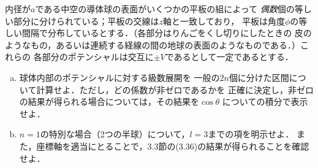 \begin{bx1}
    内径が$a$である中空の導体球の表面がいくつかの平板の組によって
    \emph{偶数}個の等しい部分に分けられている；平板の交線は$z$軸と一致しており，
    平板は角度$\phi$の等しい間隔で分布しているとする．（各部分はりんごをくし切りにしたときの
    皮のようなもの，あるいは連続する経線の間の地球の表面のようなものである．）これらの
    各部分のポテンシャルは交互に$\pm V$であるとして一定であるとする．
    \begin{enumerate}[(a)]%
      \item 球体内部のポテンシャルに対する級数展開を
        一般の$2n$個に分けた区間について計算せよ．ただし，どの係数が非ゼロであるかを
        正確に決定し，非ゼロの結果が得られる場合については，その結果を$\cos\theta$
        についての積分で表示せよ．
      \item $n = 1$の特別な場合（2つの半球）について，$l = 3$までの項を明示せよ．
        また，座標軸を適当にとることで，3.3節の(3.36)の結果が得られることを確認せよ．
    \end{enumerate}%
  \end{bx1}

